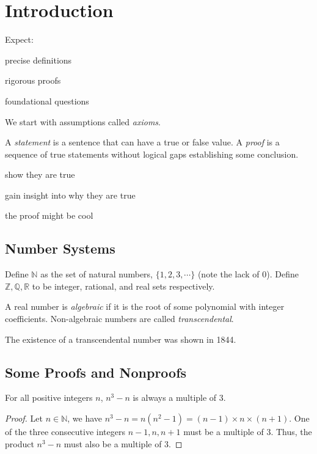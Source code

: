 \documentclass[12pt]{article}
\begin{document}

\section{Introduction}

Expect:
\begin{compactitem}
    \item precise definitions
    \item rigorous proofs
    \item foundational questions
\end{compactitem}

We start with assumptions called \emph{axioms}.

A \emph{statement} is a sentence that can have a true or false value.
A \emph{proof} is a sequence of true statements without logical gaps
establishing some conclusion.

\begin{compactitem}
\item show they are true
\item gain insight into why they are true
\item the proof might be cool
\end{compactitem}

\subsection{Number Systems}

Define $\mathbb{N}$ as the set of natural numbers, $\{1,2,3,\cdots\}$ (note the lack of $0$).
Define $\mathbb{Z},\mathbb{Q},\mathbb{R}$ to be 
integer, rational, and real sets respectively.

A real number is \emph{algebraic} if it is the
root of some polynomial with integer coefficients.
Non-algebraic numbers are called \emph{transcendental}.

The existence of a transcendental number was shown in 1844.

\subsection{Some Proofs and Nonproofs}

\begin{theorem}
    For all positive integers $n$, $n^{3} - n$ is always a multiple of $3$.
\end{theorem}
\begin{proof}
    Let $n \in \mathbb{N}$, we have $n^{3} - n = n(n^{2} - 1) = (n - 1) \times n \times (n+1)$.
    One of the three consecutive integers $n-1,n,n+1$ must be a multiple of $3$.
    Thus, the product $n^{3} - n$ must also be a multiple of $3$.
\end{proof}
\end{document}
